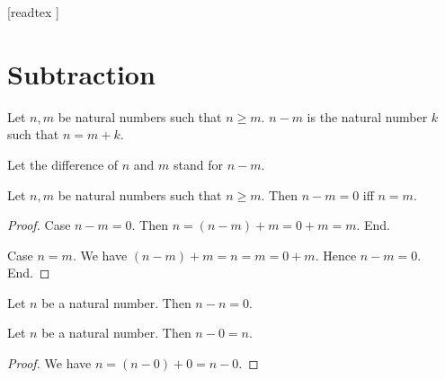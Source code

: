 \documentclass[10pt]{article}
\begin{document}
  \begin{imports}
    \begin{forthel}
      [readtex ]
    \end{forthel}
  \end{imports}


  \section*{Subtraction}

  \begin{forthel}
    \begin{definition}[id=ARITHMETIC_05_8878757276286976,printid]
      Let $n, m$ be natural numbers such that $n \geq m$.
      $n - m$ is the natural number $k$ such that $n = m + k$.
    \end{definition}

    Let the difference of $n$ and $m$ stand for $n - m$.
  \end{forthel}

  \begin{forthel}
    \begin{proposition}[id=ARITHMETIC_05_874271710642176,printid]
      Let $n, m$ be natural numbers such that $n \geq m$.
      Then $n - m = 0$ iff $n = m$.
    \end{proposition}
    \begin{proof}
      Case $n - m = 0$.
        Then $n
          = (n - m) + m
          = 0 + m
          = m$.
      End.

      Case $n = m$.
        We have $(n - m) + m
          = n
          = m
          = 0 + m$.
        Hence $n - m = 0$.
      End.
    \end{proof}
  \end{forthel}

  \begin{forthel}
    \begin{corollary}[id=ARITHMETIC_05_8457713057005568,printid]
      Let $n$ be a natural number.
      Then $n - n = 0$.
    \end{corollary}
  \end{forthel}

  \begin{forthel}
    \begin{proposition}[id=ARITHMETIC_05_8518521570983936,printid]
      Let $n$ be a natural number.
      Then $n - 0 = n$.
    \end{proposition}
    \begin{proof}
      We have $n
        = (n - 0) + 0
        = n - 0$.
    \end{proof}
  \end{forthel}
\end{document}
